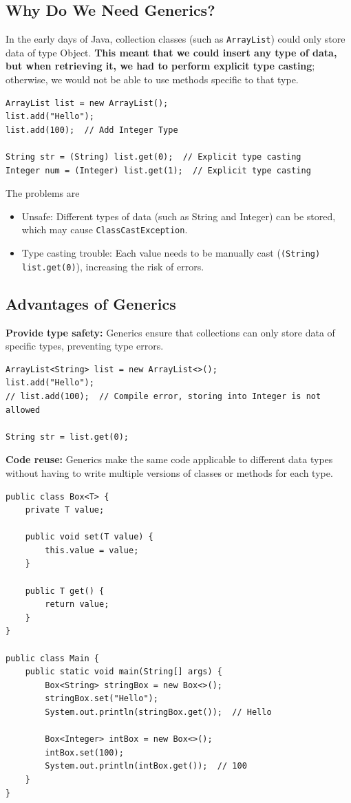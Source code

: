 \documentclass[letterpaper,12pt]{article}
\begin{document}
\subsection{Why Do We Need Generics?}
In the early days of Java, collection classes (such as \texttt{ArrayList}) could only store data of type Object. \textbf{This meant that we could insert any type of data, but when retrieving it, we had to perform explicit type casting}; otherwise, we would not be able to use methods specific to that type.
\begin{verbatim}
ArrayList list = new ArrayList();
list.add("Hello");
list.add(100);  // Add Integer Type

String str = (String) list.get(0);  // Explicit type casting
Integer num = (Integer) list.get(1);  // Explicit type casting
\end{verbatim}
The problems are
\begin{itemize}
    \item Unsafe: Different types of data (such as String and Integer) can be stored, which may cause \texttt{ClassCastException}.
    \item Type casting trouble: Each value needs to be manually cast (\texttt{(String) list.get(0)}), increasing the risk of errors.
\end{itemize}

\subsection{Advantages of Generics}
\textbf{Provide type safety:} Generics ensure that collections can only store data of specific types, preventing type errors.
\begin{verbatim}
ArrayList<String> list = new ArrayList<>();
list.add("Hello");  
// list.add(100);  // Compile error, storing into Integer is not allowed

String str = list.get(0);
\end{verbatim}
\textbf{Code reuse:} Generics make the same code applicable to different data types without having to write multiple versions of classes or methods for each type.
\begin{verbatim}
public class Box<T> {  
    private T value;  

    public void set(T value) {
        this.value = value;
    }

    public T get() {
        return value;
    }
}

public class Main {
    public static void main(String[] args) {
        Box<String> stringBox = new Box<>();
        stringBox.set("Hello");
        System.out.println(stringBox.get());  // Hello

        Box<Integer> intBox = new Box<>();
        intBox.set(100);
        System.out.println(intBox.get());  // 100
    }
}
\end{verbatim}
\end{document}
